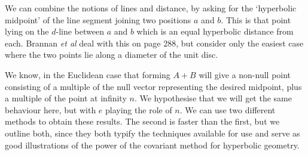 We can combine the notions of lines and distance, by asking for
the `hyperbolic midpoint' of the line segment joining two
positions $a$ and $b$. This is that point lying on the $d$-line
between $a$ and $b$ which is an equal hyperbolic distance from
each. Brannan \emph{et al}\cite{GEOM:Brannan} deal with this on page 288, but
consider only the easiest case where the two points lie along a diameter of
the unit disc.

We know, in the Euclidean case that forming $A+B$ will give a
non-null point consisting of a multiple of the null vector
representing the desired midpoint, plus a multiple of the point at
infinity $n$. We hypothesise that we will get the same behaviour
here, but with $e$ playing the role of $n$. We can use two
different methods to obtain these results. The second is faster
than the first, but we outline both, since they both typify the
techniques available for use and serve as good illustrations of
the power of the covariant method for hyperbolic geometry.

